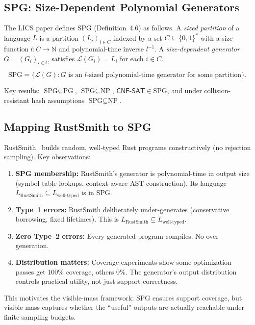 \documentclass[11pt]{article}
\newcommand{\SPG}{\text{SPG}}
\newcommand{\PG}{\text{PG}}
\newcommand{\NP}{\text{NP}}
\theoremstyle{remark}
\theoremstyle{definition}
\begin{document}
\subsection{SPG: Size-Dependent Polynomial Generators}\label{sec:spg-recap}

The LICS paper defines SPG (Definition~4.6) as follows.  A \emph{sized
partition}\label{def:size-partition} of a language $L$ is a partition $(L_i)_{i \in C}$ indexed by a set
$C \subseteq \{0,1\}^*$ with a size function $l : C \to \mathbb{N}$ and
polynomial-time inverse $l^{-1}$.  A \emph{size-dependent generator}
$G = (G_i)_{i \in C}$ satisfies $\mathcal{L}(G_i) = L_i$ for each $i \in C$.

\[
\SPG{} = \{\mathcal{L}(G) : G \text{ is an } l\text{-sized polynomial-time
generator for some partition}\}.
\]

Key results: $\SPG{} \subseteq \PG{}$, $\SPG{} \subseteq \NP{}$,
$\mathsf{CNF\text{-}SAT} \in \SPG{}$, and under collision-resistant hash
assumptions $\SPG{} \subsetneq \NP{}$.

\subsection{Mapping RustSmith to SPG}\label{sec:rustsmith-spg}

RustSmith~\cite{sharma2023rustsmith} builds random, well-typed Rust programs
constructively (no rejection sampling).  Key observations:

\begin{enumerate}
  \item \textbf{SPG membership:} RustSmith's generator is polynomial-time in
    output size (symbol table lookups, context-aware AST construction).  Its
    language $L_{\text{RustSmith}} \subseteq L_{\text{well-typed}}$ is in SPG.
  \item \textbf{Type~1 errors:} RustSmith deliberately under-generates
    (conservative borrowing, fixed lifetimes).  This is
    $L_{\text{RustSmith}} \subsetneq L_{\text{well-typed}}$.
  \item \textbf{Zero Type~2 errors:} Every generated program compiles.  No
    over-generation.
  \item \textbf{Distribution matters:} Coverage experiments show some
    optimization passes get 100\% coverage, others 0\%.  The generator's output
    distribution controls practical utility, not just support correctness.
\end{enumerate}

This motivates the visible-mass framework: SPG ensures support coverage, but
visible mass captures whether the ``useful'' outputs are actually reachable under
finite sampling budgets.
\end{document}
